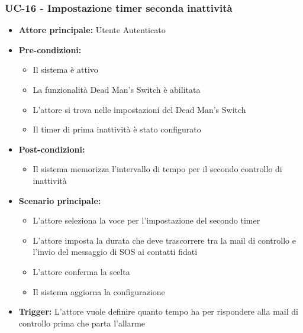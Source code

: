 \documentclass[a4paper,12pt]{article}
\begin{document}
\subsubsection{UC-16 - Impostazione timer seconda inattività} \label{sec:UC-16}
\begin{itemize}
    \item \textbf{Attore principale:} Utente Autenticato
    \item \textbf{Pre-condizioni:}
    \begin{itemize}
        \item Il sistema è attivo
        \item La funzionalità Dead Man's Switch è abilitata
        \item L'attore si trova nelle impostazioni del Dead Man's Switch
        \item Il timer di prima inattività è stato configurato
    \end{itemize}
    \item \textbf{Post-condizioni:}
    \begin{itemize}
        \item Il sistema memorizza l'intervallo di tempo per il secondo controllo di inattività
    \end{itemize}
    \item \textbf{Scenario principale:}
    \begin{itemize}
        \item L'attore seleziona la voce per l'impostazione del secondo timer
        \item L'attore imposta la durata che deve trascorrere tra la mail di controllo e l'invio del messaggio di SOS ai contatti fidati
        \item L'attore conferma la scelta
        \item Il sistema aggiorna la configurazione
    \end{itemize}
    \item \textbf{Trigger:} L'attore vuole definire quanto tempo ha per rispondere alla mail di controllo prima che parta l'allarme
\end{itemize}
\end{document}
